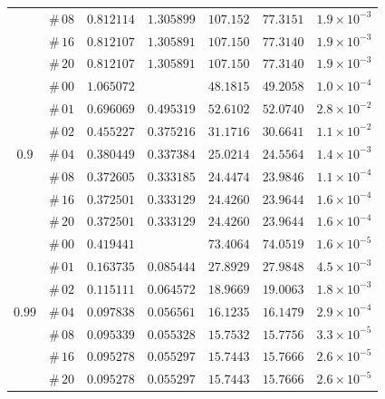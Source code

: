 \documentclass[12pt]{extarticle}
\theoremstyle{plain}
\theoremstyle{remark}
\begin{document}
\begin{table}[!ht]
\begin{center}
\begin{tabular}{ccccccc}
 & $\#\,08$ & $0.812114$ & $1.305899$ & $107.152$ & $77.3151$ & $1.9\times10^{-3}$ \\
 & $\#\,16$ & $0.812107$ & $1.305891$ & $107.150$ & $77.3140$ & $1.9\times10^{-3}$ \\
 & $\#\,20$ & $0.812107$ & $1.305891$ & $107.150$ & $77.3140$ & $1.9\times10^{-3}$ \\
\midrule
\multirow{7}{*}{$0.9$} & $\#\,00$ & $1.065072$ &  & $48.1815$ & $49.2058$ & $1.0\times10^{-4}$ \\
 & $\#\,01$ & $0.696069$ & $0.495319$ & $52.6102$ & $52.0740$ & $2.8\times10^{-2}$ \\
 & $\#\,02$ & $0.455227$ & $0.375216$ & $31.1716$ & $30.6641$ & $1.1\times10^{-2}$ \\
 & $\#\,04$ & $0.380449$ & $0.337384$ & $25.0214$ & $24.5564$ & $1.4\times10^{-3}$ \\
 & $\#\,08$ & $0.372605$ & $0.333185$ & $24.4474$ & $23.9846$ & $1.1\times10^{-4}$ \\
 & $\#\,16$ & $0.372501$ & $0.333129$ & $24.4260$ & $23.9644$ & $1.6\times10^{-4}$ \\
 & $\#\,20$ & $0.372501$ & $0.333129$ & $24.4260$ & $23.9644$ & $1.6\times10^{-4}$ \\
\midrule
\multirow{7}{*}{$0.99$} & $\#\,00$ & $0.419441$ &  & $73.4064$ & $74.0519$ & $1.6\times10^{-5}$ \\
 & $\#\,01$ & $0.163735$ & $0.085444$ & $27.8929$ & $27.9848$ & $4.5\times10^{-3}$ \\
 & $\#\,02$ & $0.115111$ & $0.064572$ & $18.9669$ & $19.0063$ & $1.8\times10^{-3}$ \\
 & $\#\,04$ & $0.097838$ & $0.056561$ & $16.1235$ & $16.1479$ & $2.9\times10^{-4}$ \\
 & $\#\,08$ & $0.095339$ & $0.055328$ & $15.7532$ & $15.7756$ & $3.3\times10^{-5}$ \\
 & $\#\,16$ & $0.095278$ & $0.055297$ & $15.7443$ & $15.7666$ & $2.6\times10^{-5}$ \\
 & $\#\,20$ & $0.095278$ & $0.055297$ & $15.7443$ & $15.7666$ & $2.6\times10^{-5}$ \\
\bottomrule
\end{tabular}
\label{supp-table-3D-IterativeMethod-M=0.10}
\end{center}
\end{table}
\end{document}
